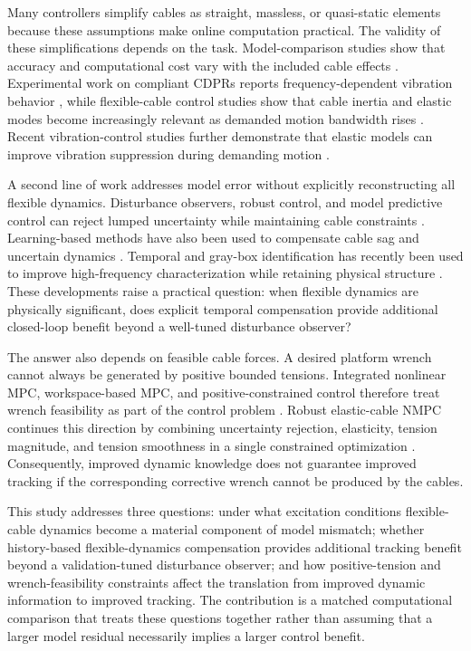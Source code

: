 \documentclass[conference]{IEEEtran}
\begin{document}
Many controllers simplify cables as straight, massless, or quasi-static elements because these assumptions make online computation practical. The validity of these simplifications depends on the task. Model-comparison studies show that accuracy and computational cost vary with the included cable effects \cite{Fabritius2023}. Experimental work on compliant CDPRs reports frequency-dependent vibration behavior \cite{Peng2023}, while flexible-cable control studies show that cable inertia and elastic modes become increasingly relevant as demanded motion bandwidth rises \cite{Bettega2023,Moussa2024,Saadaoui2025}. Recent vibration-control studies further demonstrate that elastic models can improve vibration suppression during demanding motion \cite{Zhao2025,Rousseau2026}.

A second line of work addresses model error without explicitly reconstructing all flexible dynamics. Disturbance observers, robust control, and model predictive control can reject lumped uncertainty while maintaining cable constraints \cite{Gao2025,Lu2024}. Learning-based methods have also been used to compensate cable sag and uncertain dynamics \cite{Tachia2025}. Temporal and gray-box identification has recently been used to improve high-frequency characterization while retaining physical structure \cite{Wang2026}. These developments raise a practical question: when flexible dynamics are physically significant, does explicit temporal compensation provide additional closed-loop benefit beyond a well-tuned disturbance observer?

The answer also depends on feasible cable forces. A desired platform wrench cannot always be generated by positive bounded tensions. Integrated nonlinear MPC, workspace-based MPC, and positive-constrained control therefore treat wrench feasibility as part of the control problem \cite{Santos2022,Song2022,Ameri2024}. Robust elastic-cable NMPC continues this direction by combining uncertainty rejection, elasticity, tension magnitude, and tension smoothness in a single constrained optimization \cite{Bellila2026}. Consequently, improved dynamic knowledge does not guarantee improved tracking if the corresponding corrective wrench cannot be produced by the cables.

This study addresses three questions: under what excitation conditions flexible-cable dynamics become a material component of model mismatch; whether history-based flexible-dynamics compensation provides additional tracking benefit beyond a validation-tuned disturbance observer; and how positive-tension and wrench-feasibility constraints affect the translation from improved dynamic information to improved tracking. The contribution is a matched computational comparison that treats these questions together rather than assuming that a larger model residual necessarily implies a larger control benefit.
\end{document}
